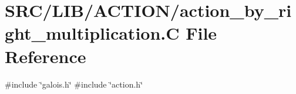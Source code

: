 \hypertarget{action__by__right__multiplication_8_c}{}\section{S\+R\+C/\+L\+I\+B/\+A\+C\+T\+I\+O\+N/action\+\_\+by\+\_\+right\+\_\+multiplication.C File Reference}
\label{action__by__right__multiplication_8_c}
{\ttfamily \#include \char`\"{}galois.\+h\char`\"{}}\newline
{\ttfamily \#include \char`\"{}action.\+h\char`\"{}}\newline
